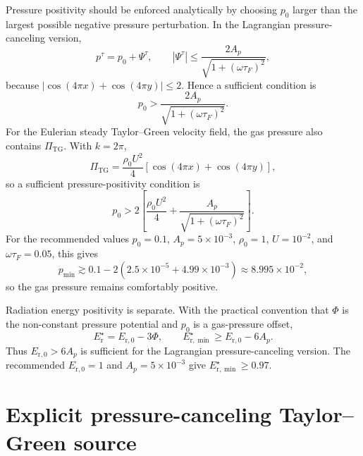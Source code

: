 \documentclass[11pt]{article}
\newcommand{\Er}{E_{\mathrm r}}
\newcommand{\Erzero}{E_{\mathrm r,0}}
\begin{document}
Pressure positivity should be enforced analytically by choosing \(p_0\) larger
than the largest possible negative pressure perturbation.  In the Lagrangian
pressure-canceling version,
\begin{equation}
  p^\tau = p_0 + \Psi^\tau,
  \qquad
  |\Psi^\tau|
  \le
  \frac{2A_p}{\sqrt{1+(\omega\tau_F)^2}},
  \label{eq:lagrangian-pressure-bound}
\end{equation}
because \(|\cos(4\pi x)+\cos(4\pi y)|\le2\).  Hence a sufficient condition is
\begin{equation}
  \boxed{
  p_0 >
  \frac{2A_p}{\sqrt{1+(\omega\tau_F)^2}}.
  }
  \label{eq:lagrangian-pressure-positivity}
\end{equation}
For the Eulerian steady Taylor--Green velocity field, the gas pressure also
contains \(\Pi_{\mathrm{TG}}\).  With \(k=2\pi\),
\begin{equation}
  \Pi_{\mathrm{TG}}
  =
  \frac{\rho_0U^2}{4}
  \left[\cos(4\pi x)+\cos(4\pi y)\right],
  \label{eq:practical-pitg}
\end{equation}
so a sufficient pressure-positivity condition is
\begin{equation}
  \boxed{
  p_0 >
  2\left[
    \frac{\rho_0U^2}{4}
    +
    \frac{A_p}{\sqrt{1+(\omega\tau_F)^2}}
  \right].
  }
  \label{eq:eulerian-pressure-positivity}
\end{equation}
For the recommended values \(p_0=0.1\), \(A_p=5\times10^{-3}\),
\(\rho_0=1\), \(U=10^{-2}\), and \(\omega\tau_F=0.05\), this gives
\begin{equation}
  p_{\min}
  \gtrsim
  0.1 - 2\left(2.5\times10^{-5}+4.99\times10^{-3}\right)
  \approx 8.995\times10^{-2},
  \label{eq:recommended-pressure-min}
\end{equation}
so the gas pressure remains comfortably positive.

Radiation energy positivity is separate.  With the practical convention that
\(\Phi\) is the non-constant pressure potential and \(p_0\) is a gas-pressure
offset,
\begin{equation}
  \Er^\star=\Erzero-3\Phi,
  \qquad
  E_{\mathrm r,\min}^\star
  \ge
  \Erzero-6A_p.
  \label{eq:radiation-energy-bound}
\end{equation}
Thus \(\Erzero>6A_p\) is sufficient for the Lagrangian pressure-canceling
version.  The recommended \(\Erzero=1\) and \(A_p=5\times10^{-3}\) give
\(E_{\mathrm r,\min}^\star\ge0.97\).

\section{Explicit pressure-canceling Taylor--Green source}
\end{document}
